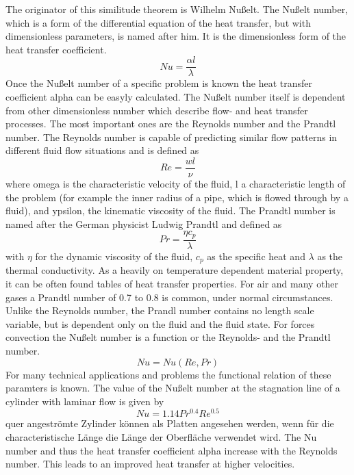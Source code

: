 The originator of this similitude theorem is Wilhelm Nußelt. The Nußelt number, which is a form of the differential equation of the heat transfer, but with dimensionless parameters, is named after him. It is the dimensionless form of the heat transfer coefficient.
\begin{equation}
\label{eq:Nu1}
Nu = \frac{\alpha l}{\lambda}
\end{equation}
Once the Nußelt number of a specific problem is known the heat transfer coefficient alpha can be easyly calculated. The Nußelt number itself is dependent from other dimensionless number which describe flow- and heat transfer processes.
The most important ones are the Reynolds number and the Prandtl number. The Reynolds number is capable of predicting similar flow patterns in different fluid flow situations and is defined as 
\begin{equation}
Re = \frac{w l}{\nu}
\end{equation}
where omega is the characteristic velocity of the fluid, l a characteristic length of the problem (for example the inner radius of a pipe, which is flowed through by a fluid), and ypsilon, the kinematic viscosity of the fluid.
The Prandtl number is named after the German physicist Ludwig Prandtl and defined as
\begin{equation}
Pr = \frac{\eta c_p}{\lambda}
\end{equation}
with $\eta$ for the dynamic viscosity of the fluid, $c_p$ as the specific heat and $\lambda$ as the thermal conductivity. As a heavily on temperature dependent material property, it can be often found tables of heat transfer properties. For air and many other gases a Prandtl number of 0.7 to 0.8 is common, under normal circumstances. Unlike the Reynolds number, the Prandl number contains no length scale variable, but is dependent only on the fluid and the fluid state.
For forces convection the Nußelt number is a function or the Reynolds- and the Prandtl number.
\begin{equation}
Nu = Nu( Re, Pr )
\end{equation}
For many technical applications and problems the functional relation of these paramters is known. The value of the Nußelt number at the stagnation line of a cylinder with laminar flow is given by
\begin{equation}
\label{eq:Nu2}
Nu = 1.14Pr^{0.4} Re^{0.5} 
\end{equation}
quer angeströmte Zylinder können als Platten angesehen werden, wenn für die characteristische Länge die Länge der Oberfläche verwendet wird. The Nu number and thus the heat transfer coefficient alpha increase with the Reynolds number. This leads to an improved heat transfer at higher velocities. 
